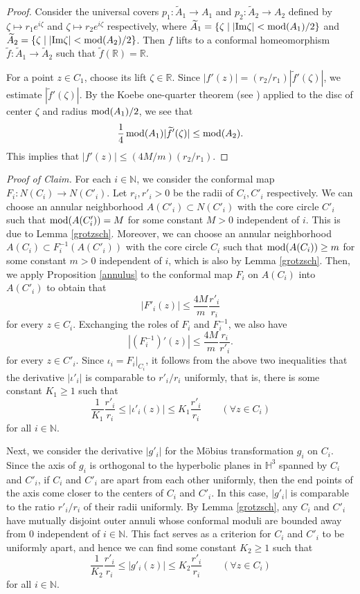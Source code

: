 \documentclass[12pt]{amsart}
\theoremstyle{plain}
\begin{document}
\begin{proof}
Consider the universal covers $p_1:\widetilde A_1 \to A_1$ and $p_2:\widetilde A_2 \to A_2$
defined by $\zeta \mapsto r_1 e^{i\zeta}$ and $\zeta \mapsto r_2 e^{i\zeta}$ respectively,
where $\widetilde A_1=\{\zeta \mid |{\rm Im} \zeta| <{\rm mod}(A_1)/2\}$ and
$\widetilde A_2=\{\zeta \mid |{\rm Im} \zeta| <{\rm mod}(A_2)/2\}$. 
Then $f$ lifts to a conformal homeomorphism
$\widetilde f:\widetilde A_1 \to \widetilde A_2$ such that $\widetilde f(\mathbb R)=\mathbb R$. 

For a point $z \in C_1$, choose its lift $\zeta \in \mathbb R$. Since $|f'(z)|=(r_2/r_1)|\widetilde f'(\zeta)|$,
we estimate $|\widetilde f'(\zeta)|$. By the Koebe one-quarter theorem (see \cite[p.56]{LV}) applied to the disc of center $\zeta$ and
radius ${\rm mod}(A_1)/2$, we see that
$$
\frac{1}{4}\, {\rm mod}(A_1) |\widetilde f'(\zeta)| \leq {\rm mod}(A_2).
$$
This implies that $|f'(z)| \leq (4M/m)(r_2/r_1)$.
\end{proof}


\noindent
{\it Proof of Claim.}
For each $i \in \mathbb N$, we consider the conformal map $F_i:N(C_i) \to N(C'_i)$. 
Let $r_i, r'_i>0$ be the radii of $C_i, C'_i$ respectively. 
We can choose an annular neighborhood $A(C'_i) \subset N(C'_i)$ with the core circle $C'_i$ such that
${\rm mod}(A(C'_i))=M$
for some constant $M>0$ independent of $i$. This is due to Lemma \ref{grotzsch}.
Moreover, we can choose an annular neighborhood $A(C_i) \subset F_i^{-1}(A(C'_i))$ with the core circle $C_i$ such that
${\rm mod}(A(C_i)) \geq m$ for some constant $m>0$ independent of $i$, which is also by Lemma \ref{grotzsch}.
Then, we apply Proposition \ref{annulus} to the conformal map $F_i$ on $A(C_i)$ into $A(C'_i)$ to obtain that
$$
|F'_i(z)| \leq \frac{4M}{m} \frac{r'_i}{r_i}
$$
for every $z \in C_i$. Exchanging the roles of $F_i$ and $F_i^{-1}$, we also have
$$
|(F_i^{-1})'(z)| \leq \frac{4M}{m} \frac{r_i}{r'_i}.
$$
for every $z \in C'_i$. 
Since $\iota_i=F_i|_{C_i}$, it follows from the above two inequalities that the derivative $|\iota'_i|$ is 
comparable to $r'_i/r_i$ uniformly, that is, there is some constant $K_1 \geq 1$ such that
$$
\frac{1}{K_1} \frac{r'_i}{r_i} \leq |\iota'_i(z)| \leq K_1 \frac{r'_i}{r_i} \qquad (\forall z \in C_i)
$$
for all $i \in \mathbb N$. 


Next, we consider the derivative $|g'_i|$ for the M\"obius transformation $g_i$ on $C_i$.
Since the axis of $g_i$ is orthogonal to the hyperbolic planes in $\mathbb H^3$ spanned by $C_i$ and $C'_i$,
if $C_i$ and $C'_i$ are apart from each other uniformly, then the end points of the axis come closer to
the centers of $C_i$ and $C'_i$. In this case, $|g'_i|$ is 
comparable to the ratio $r'_i/r_i$ of their radii uniformly. By Lemma \ref{grotzsch}, any 
$C_i$ and $C'_i$ have mutually disjoint outer annuli whose conformal moduli are bounded away from 0
independent of $i \in \mathbb N$. This fact serves as a criterion for $C_i$ and $C'_i$ to be uniformly apart,
and hence we can find some constant $K_2 \geq 1$ such that
$$
\frac{1}{K_2} \frac{r'_i}{r_i} \leq |g'_i(z)| \leq K_2 \frac{r'_i}{r_i} \qquad (\forall z \in C_i)
$$
for all $i \in \mathbb N$.
\end{document}
